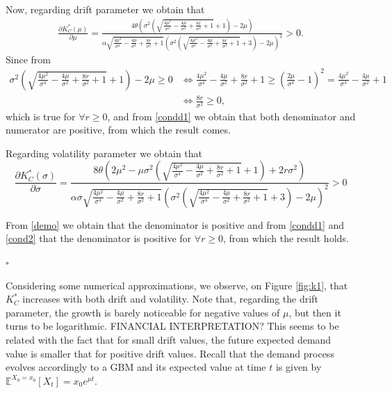 Now, regarding drift parameter we obtain that
 \begin{align*}
\frac{\partial K^*_C(\mu)}{\partial \mu}=
\frac{4 \theta \left(\sigma ^2 \left(\sqrt{\frac{4 \mu ^2}{\sigma ^4}-\frac{4 \mu }{\sigma ^2}+\frac{8 r}{\sigma ^2}+1}+1\right)-2 \mu \right)}{\alpha \sqrt{\frac{4 \mu ^2}{\sigma ^4}-\frac{4 \mu }{\sigma ^2}+\frac{8 r}{\sigma ^2}+1} \left(\sigma ^2 \left(\sqrt{\frac{4 \mu ^2}{\sigma ^4}-\frac{4 \mu }{\sigma ^2}+\frac{8 r}{\sigma ^2}+1}+3\right)-2 \mu \right)^2}>0.
\end{align*}
Since from
\begin{align}
\label{cond2}
\sigma ^2 \left(\sqrt{\frac{4 \mu ^2}{\sigma ^4}-\frac{4 \mu }{\sigma ^2}+\frac{8 r}{\sigma ^2}+1}+1\right)-2 \mu\geq0 
& \Leftrightarrow
\frac{4 \mu ^2}{\sigma ^4}-\frac{4 \mu }{\sigma ^2}+\frac{8 r}{\sigma ^2}+1 \geq \left( \frac{2 \mu}{\sigma^4}-1 \right)^2=\frac{4 \mu ^2}{\sigma ^4}-\frac{4 \mu }{\sigma ^2}+1 \\
& \Leftrightarrow
\frac{8 r}{\sigma ^2}\geq 0, \nonumber
\end{align}
which is true for $\forall r\geq 0$, and from \eqref{condd1} we obtain that both denominator and numerator are positive, from which the result comes.

Regarding volatility parameter we obtain that
 $$    \frac{\partial K^*_C(\sigma)}{\partial \sigma}= 
\frac{8 \theta \left(2 \mu ^2-\mu  \sigma ^2 \left(\sqrt{\frac{4 \mu ^2}{\sigma ^4}-\frac{4 \mu }{\sigma ^2}+\frac{8 r}{\sigma ^2}+1}+1\right)+2 r \sigma ^2\right)}{\alpha \sigma  \sqrt{\frac{4 \mu ^2}{\sigma ^4}-\frac{4 \mu }{\sigma ^2}+\frac{8 r}{\sigma ^2}+1} \left(\sigma ^2 \left(\sqrt{\frac{4 \mu ^2}{\sigma ^4}-\frac{4 \mu }{\sigma ^2}+\frac{8 r}{\sigma ^2}+1}+3\right)-2 \mu \right)^2}>0$$

From \eqref{demo} we obtain that the denominator is positive and from \eqref{condd1} and \eqref{cond2} that the denominator is positive for $\forall r\geq0$, from which the result holds.
\begin{flushright}
	$\square$
\end{flushright}


Considering some numerical approximations, we observe, on Figure \ref{fig:k1}, that $K^*_C$ increases with both drift and volatility. Note that, regarding the drift parameter, the growth is barely noticeable for negative values of $\mu$, but then it turns to be logarithmic. FINANCIAL INTERPRETATION? This seems to be related with the fact that for small drift values, the future expected demand value is smaller that for positive drift values. Recall that the demand process evolves accordingly to a GBM and its expected value at time $t$ is given by $\mathds{E} ^{X_0=x_0} [X_t]=x_0 e^{\mu t}$.

